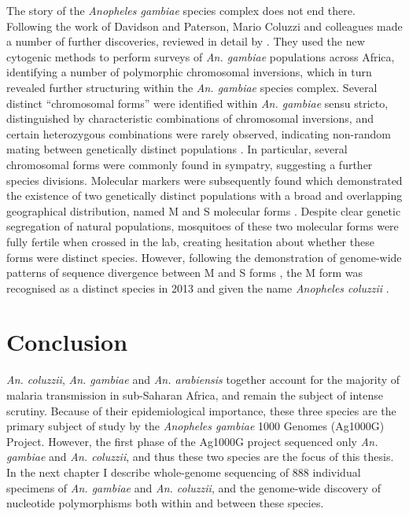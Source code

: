 \documentclass[a4paper,11pt,abstracton,hidelinks]{scrartcl}
\begin{document}
The story of the \textit{Anopheles gambiae} species complex does not end there. 
Following the work of Davidson and Paterson, Mario Coluzzi and colleagues made a number of further discoveries, reviewed in detail by \citet{Powell2014}. 
They used the new cytogenic methods to perform surveys of \textit{An. gambiae} populations across Africa, identifying a number of polymorphic chromosomal inversions, which in turn revealed further structuring within the \textit{An. gambiae} species complex. 
Several distinct ``chromosomal forms'' were identified within \textit{An. gambiae} sensu stricto, distinguished by characteristic combinations of chromosomal inversions, and certain heterozygous combinations were rarely observed, indicating non-random mating between genetically distinct populations \citep{Toure1998,Coluzzi2002}. 
In particular, several chromosomal forms were commonly found in sympatry, suggesting a further species divisions. 
Molecular markers were subsequently found which demonstrated the existence of two genetically distinct populations with a broad and overlapping geographical distribution, named M and S molecular forms \citep{dellaTorre2001}. 
Despite clear genetic segregation of natural populations, mosquitoes of these two molecular forms were fully fertile when crossed in the lab, creating hesitation about whether these forms were distinct species. 
However, following the  demonstration of genome-wide patterns of sequence divergence between M and S forms \citep{Lawniczak2010}, the M form was recognised as a distinct species in 2013 and given the name \textit{Anopheles coluzzii} \citep{Coetzee2013}. 


\section{Conclusion}


%
\textit{An. coluzzii}, \textit{An. gambiae} and \textit{An. arabiensis} together account for the majority of malaria transmission in sub-Saharan Africa, and remain the subject of intense scrutiny.
%
Because of their epidemiological importance, these three species are the primary subject of study by the \textit{Anopheles gambiae} 1000 Genomes (Ag1000G) Project. %
However, the first phase of the Ag1000G project sequenced only \textit{An. gambiae} and \textit{An. coluzzii}, and thus these two species are the focus of this thesis. %
In the next chapter I describe whole-genome sequencing of 888 individual specimens of \textit{An. gambiae} and \textit{An. coluzzii}, and the genome-wide discovery of nucleotide polymorphisms both within and between these species. 
\end{document}
